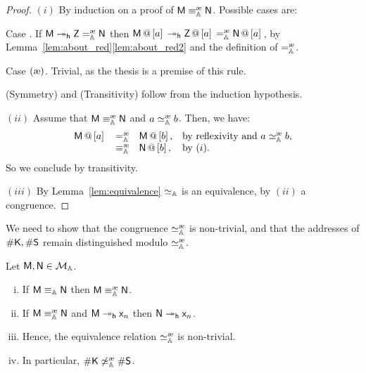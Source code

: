 \begin{proof}
$(i)$ By induction on a proof of $\mM\equivea\mN$. Possible cases are:

Case \redwerule. If $\mM\reddh \mZ \eqea \mN$ then $\append{\mM}{a}\reddh\append{\mZ}{a} \eqea \append{\mN}{a}$, by Lemma~\ref{lem:about_red}\ref{lem:about_red2} and the definition of $\eqea$.

Case $\extrule$. Trivial, as the thesis is a premise of this rule.

(Symmetry) and (Transitivity) follow from the induction hypothesis.

$(ii)$ Assume that $\mM\equivea\mN$ and $a\simea b$. Then, we have:
\[
	\begin{array}{lcll}
	\append{\mM}{a}&\eqea&\append{\mM}{b},&\textrm{by reflexivity and }a\simea b,\\
	&\equivea&\append{\mN}{b},&\textrm{by }(i).
	\end{array}
\]
So we conclude by transitivity.

$(iii)$ By Lemma~\ref{lem:equivalence} $\simeq_{\mathbb{A}}$ is an equivalence, by $(ii)$ a congruence.
\end{proof}

We need to show that the congruence $\simea$ is non-trivial, and that the addresses of $\#\mathsf K,\#\mathsf S$ remain distinguished modulo $\simea$.

\begin{lem}\label{lem:about:equivo}
Let $\mathsf M,\mathsf N\in\mathcal{M}_{\mathbb{A}}$.
\begin{enumerate}[(i)]
\item\label{lem:about:equivo1}
	If $\mathsf M\equiv_{\mathbb{A}} \mathsf N$ then $\mM\equivea\mN$.
\item\label{lem:about:equivo2}
	If $\mM\equivea \mN$ and $\mathsf M\twoheadrightarrow_{\mathsf{h}}\mathsf{x}_n$ then $\mathsf N\twoheadrightarrow_{\mathsf{h}} \mathsf{x}_n$.
\item\label{lem:about:equivo3}
	Hence, the equivalence relation $\simea$ is non-trivial.
\item\label{lem:about:equivo4}
		In particular, $\Lookup \mach{K} \not\simea \Lookup \mach{S}$.
\end{enumerate}
\end{lem}

